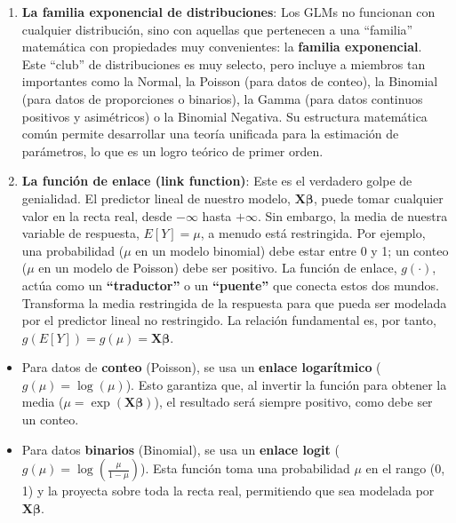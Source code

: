 \documentclass[
  letterpaper,
  DIV=11,
  numbers=noendperiod]{scrreprt}
\providecommand{\tightlist}{%
  \setlength{\itemsep}{0pt}\setlength{\parskip}{0pt}}
\begin{document}
\begin{enumerate}
\def\labelenumi{\arabic{enumi}.}
\item
  \textbf{La familia exponencial de distribuciones}: Los GLMs no
  funcionan con cualquier distribución, sino con aquellas que pertenecen
  a una ``familia'' matemática con propiedades muy convenientes: la
  \textbf{familia exponencial}. Este ``club'' de distribuciones es muy
  selecto, pero incluye a miembros tan importantes como la Normal, la
  Poisson (para datos de conteo), la Binomial (para datos de
  proporciones o binarios), la Gamma (para datos continuos positivos y
  asimétricos) o la Binomial Negativa. Su estructura matemática común
  permite desarrollar una teoría unificada para la estimación de
  parámetros, lo que es un logro teórico de primer orden.
\item
  \textbf{La función de enlace (link function)}: Este es el verdadero
  golpe de genialidad. El predictor lineal de nuestro modelo,
  \(\boldsymbol{X\beta}\), puede tomar cualquier valor en la recta real,
  desde \(-\infty\) hasta \(+\infty\). Sin embargo, la media de nuestra
  variable de respuesta, \(E[Y] = \mu\), a menudo está restringida. Por
  ejemplo, una probabilidad (\(\mu\) en un modelo binomial) debe estar
  entre 0 y 1; un conteo (\(\mu\) en un modelo de Poisson) debe ser
  positivo. La función de enlace, \(g(\cdot)\), actúa como un
  \textbf{``traductor''} o un \textbf{``puente''} que conecta estos dos
  mundos. Transforma la media restringida de la respuesta para que pueda
  ser modelada por el predictor lineal no restringido. La relación
  fundamental es, por tanto, \(g(E[Y]) = g(\mu) = \boldsymbol{X\beta}\).
\end{enumerate}

\begin{itemize}
\tightlist
\item
  Para datos de \textbf{conteo} (Poisson), se usa un \textbf{enlace
  logarítmico} (\(g(\mu) = \log(\mu)\)). Esto garantiza que, al invertir
  la función para obtener la media
  (\(\mu = \exp(\boldsymbol{X\beta})\)), el resultado será siempre
  positivo, como debe ser un conteo.
\item
  Para datos \textbf{binarios} (Binomial), se usa un \textbf{enlace
  logit} (\(g(\mu) = \log(\frac{\mu}{1-\mu})\)). Esta función toma una
  probabilidad \(\mu\) en el rango (0, 1) y la proyecta sobre toda la
  recta real, permitiendo que sea modelada por \(\boldsymbol{X\beta}\).
\end{itemize}
\end{document}
